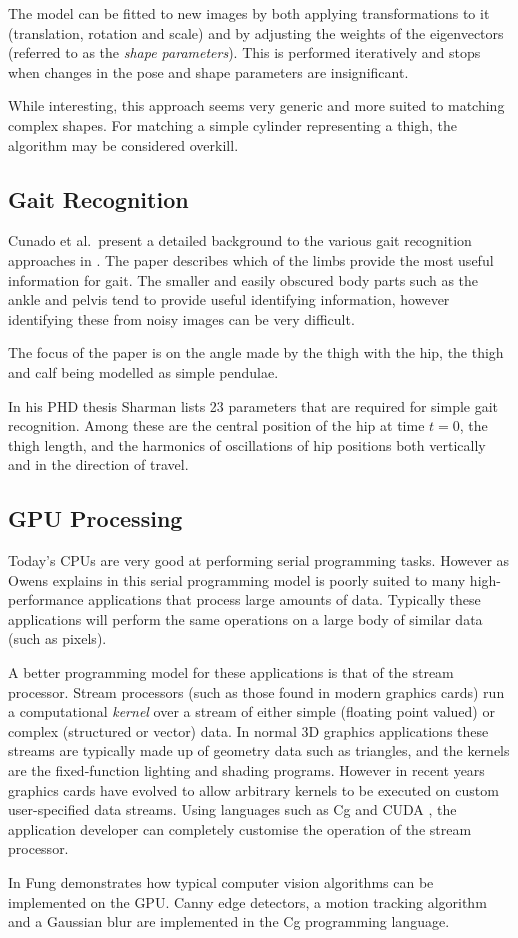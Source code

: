 The model can be fitted to new images by both applying transformations to it (translation, rotation and scale) and by adjusting the weights of the eigenvectors (referred to as the \emph{shape parameters}).
This is performed iteratively and stops when changes in the pose and shape parameters are insignificant.

While interesting, this approach seems very generic and more suited to matching complex shapes.
For matching a simple cylinder representing a thigh, the algorithm may be considered overkill.

\subsection{Gait Recognition}

Cunado et al.\ present a detailed background to the various gait recognition approaches in \cite{GaitModels}.
The paper describes which of the limbs provide the most useful information for gait.
The smaller and easily obscured body parts such as the ankle and pelvis tend to provide useful identifying information, however identifying these from noisy images can be very difficult.

The focus of the paper is on the angle made by the thigh with the hip, the thigh and calf being modelled as simple pendulae.

\bigskip
\noindent In his PHD thesis \cite{KarlSharman} Sharman lists 23 parameters that are required for simple gait recognition.
Among these are the central position of the hip at time $t = 0$, the thigh length, and the harmonics of oscillations of hip positions both vertically and in the direction of travel.


\subsection{GPU Processing}

Today's CPUs are very good at performing serial programming tasks.
However as Owens explains in \cite{GemsStreams} this serial programming model is poorly suited to many high-performance applications that process large amounts of data.
Typically these applications will perform the same operations on a large body of similar data (such as pixels).

A better programming model for these applications is that of the stream processor.
Stream processors (such as those found in modern graphics cards) run a computational \emph{kernel} over a stream of either simple (floating point valued) or complex (structured or vector) data.
In normal 3D graphics applications these streams are typically made up of geometry data such as triangles, and the kernels are the fixed-function lighting and shading programs.
However in recent years graphics cards have evolved to allow arbitrary kernels to be executed on custom user-specified data streams.
Using languages such as Cg \cite{CgToolkit} and CUDA \cite{CudaToolkit}, the application developer can completely customise the operation of the stream processor.

\bigskip
\noindent In \cite{GemsVision} Fung demonstrates how typical computer vision algorithms can be implemented on the GPU.
Canny edge detectors, a motion tracking algorithm and a Gaussian blur are implemented in the Cg programming language.